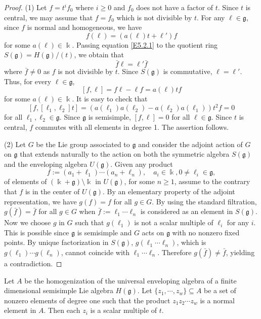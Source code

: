 \begin{proof} (1) Let $f=t^i f_0$ where $i\geq 0$ and $f_0$ does not have a 
factor of $t$. Since $t$ is central, we may assume that $f=f_0$ which 
is not divisible by $t$. For any $\ell\in {\mathfrak g}$, since $f$ is normal
and homogeneous, we have 
\begin{equation}
\label{E5.2.1}\tag{E5.2.1}
f(\ell)=(a(\ell) t +\ell') f
\end{equation}
for some $a(\ell)\in \Bbbk$. Passing equation \eqref{E5.2.1} to the quotient
ring $S({\mathfrak g})=H({\mathfrak g})/(t)$, we obtain that
$$\bar{f} \ell= \ell' \bar{f}$$
where $\bar{f}\neq 0$ as $f$ is not divisible by $t$. Since $S({\mathfrak g})$
is commutative, $\ell=\ell'$. Thus, for every $\ell\in {\mathfrak g}$,
$$[f,\ell]=f\ell-\ell f=a(\ell) tf$$
for some $a(\ell)\in \Bbbk$. It is easy to check that 
$$[f,[\ell_1,\ell_2]t]=(a(\ell_1)a(\ell_2)-a(\ell_2)a(\ell_1)) t^2 f=0$$
for all $\ell_1,\ell_2\in {\mathfrak g}$. Since ${\mathfrak g}$ is semisimple,
$[f, \ell]=0$ for all $\ell\in {\mathfrak g}$. Since $t$ is central,
$f$ commutes with all elements in degree 1. The assertion follows. 

(2)  Let $G$ be the Lie group associated to ${\mathfrak g}$ and 
consider the adjoint action of $G$ on ${\mathfrak g}$ that extends naturally 
to the action on both the symmetric algebra $S({\mathfrak g})$ and the 
enveloping algebra $U({\mathfrak g})$.  Given any product 
$$f:=(a_1+\ell_1) \cdots (a_n+\ell_n), \quad
a_i\in \Bbbk, 0\neq \ell_i\in {\mathfrak g},$$ 
of elements of $(\Bbbk+{\mathfrak g})\setminus \Bbbk$ in $U({\mathfrak g})$, for some $n\geq 1$,
assume to the contrary that $f$ is in the center of $U({\mathfrak g})$. By an 
elementary property of the adjoint representation, we have $g(f)=f$ for all 
$g\in G$. By using the standard filtration, $g(\bar{f})=\bar{f}$ for all $g\in G$ 
when $\bar{f}:=\ell_1\cdots \ell_n$ is considered as an element in $S({\mathfrak g})$. 
Now we choose $g$ in $G$ such that  $g(\ell_1)$ is not a scalar multiple of 
$\ell_i$ for any $i$. This is possible since ${\mathfrak g}$ is semisimple and 
$G$ acts on ${\mathfrak g}$ with no nonzero fixed points.  By unique factorization 
in $S({\mathfrak g})$, $g(\ell_1 \cdots\ell_n)$, which is 
$g(\ell_1)\cdots g(\ell_n)$, cannot coincide with $\ell_1\cdots\ell_n$.
Therefore $g(\bar{f})\neq \bar{f}$, yielding a contradiction.
\end{proof}

\begin{lemma}
\label{xxlem5.3} 
Let $A$ be the homogenization of the universal enveloping algebra of a finite 
dimensional semisimple Lie algebra $H({\mathfrak g})$. Let $\{z_1,\cdots, z_w\}
\subseteq A$ be a set of nonzero elements of degree one such that the product 
$z_1 z_2\cdots z_w$ is a normal element in $A$. Then each $z_i$ is a scalar 
multiple of $t$. 
\end{lemma}

